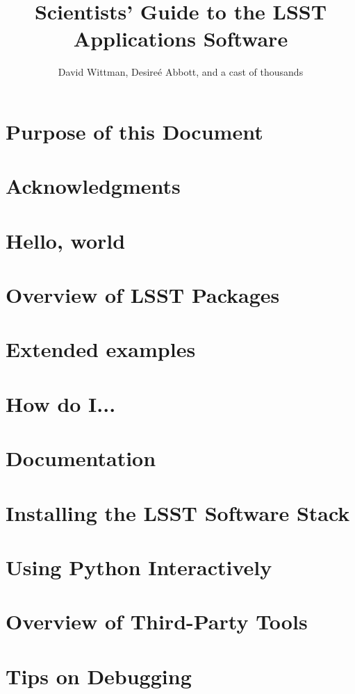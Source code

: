 \documentclass[oneside]{book}
\title{Scientists' Guide to the LSST Applications Software}
\author{David Wittman, Desire\'{e} Abbott, and a cast of thousands}
\begin{document}
\maketitle

\chapter*{Purpose of this Document\label{chap-purpose}}


\chapter*{Acknowledgments\label{chap-acknowledgements}}



\chapter{Hello, world\label{chap-hello}}


\chapter{Overview of LSST Packages\label{chap-overview}}



\chapter{Extended examples\label{chap-examples}}


\chapter{How do I...\label{chap-howto}}


\chapter{Documentation\label{chap-doc}}


%
% 



\appendix

\chapter{Installing the LSST Software Stack\label{appendix-stackinstall}}


\chapter{Using Python Interactively\label{appendix-interactivePython}}


\chapter{Overview of Third-Party Tools\label{appendix-thirdparty}}


\chapter{Tips on Debugging\label{appendix-debugging}}

\end{document}
